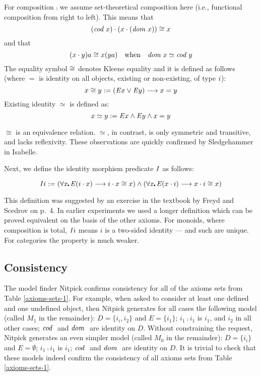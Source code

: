 For composition $\comp$ we assume set-theoretical composition here (i.e., functional 
composition from right to left). This means that
\[(\textit{cod \/} x) \cdot (x \cdot (\textit{dom \/} x)) \cong x\] 
and that 
\[(x \cdot y)a \cong x(y a) \quad \text{when}\quad
\textit{dom \/} x \simeq \textit{cod \/} y\] 
The equality symbol $\cong$ denotes Kleene equality and it
is defined as follows (where $=$ is identity on all objects, existing or non-existing, 
of type $i$):
\[x \cong y := (\mathit{E} x \vee \mathit{E} y) \longrightarrow x = y\]
Existing identity $\simeq$ is defined as:
\[x \simeq y := \mathit{E} x \wedge \mathit{E} y \wedge  x = y\]

$\cong$ is an equivalence relation. $\simeq$, in contrast, is only symmetric and transitive, and lacks 
reflexivity. These observations are quickly confirmed by Sledgehammer
in Isabelle.


Next, we define the identity morphism predicate $\textit{I\/}$ as follows: 

\[\id i \ddef (\forall x\lambdot \ex(i \comp x) \imp i \comp
x \cong x) \wedge (\forall x\lambdot \ex(x \comp i) \imp x \comp i \cong x)\]

This definition was suggested by an exercise in the textbook by Freyd
and Scedrov \cite{FreydScedrov90}
on p.~4.  In earlier experiments we used a longer definition which can
be proved equivalent on the basis of the other axioms. For monoids,
where composition is total, $\textit{I\/} i$ means $i$ is a two-sided identity
— and such are unique. For categories the property is much weaker.
 

\subsection{Consistency}
The model finder Nitpick confirms consistency for all of the axioms
sets from Table \ref{axioms-sets-1}. For example, when asked to consider at least one defined and one undefined object, then
Nitpick generates for all cases the following model (called $M_1$ in the remainder):
$D=\{i_i,i_2\}$ and $E=\{i_1\}$;  $i_1\comp i_1$ is $i_1$,  and $i_2$
in all other cases; $\textit{cod \/}$ and $\textit{dom \/}$ are identity on $D$. Without constraining the request, Nitpick
generates an even simpler model (called $M_0$ in the remainder):
$D=\{i_i\}$ and $E=\emptyset$; $i_1\comp i_1$ is $i_1$; $\textit{cod \/}$ and
$\textit{dom \/}$ are identity on $D$. It is trivial to check that these models
indeed confirm the consistency of all axioms sets from Table \ref{axioms-sets-1}.



